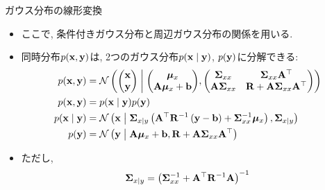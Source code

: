 \documentclass[dvipdfmx,notheorems,t]{beamer}
\begin{document}
\begin{frame}{ガウス分布の線形変換}
\begin{itemize}
  \item ここで, 条件付きガウス分布と周辺ガウス分布の関係を用いる.
  \item 同時分布$p(\vb{x}, \vb{y})$は, 2つのガウス分布$p(\vb{x} \mid \vb{y})$, $p(\vb{y})$に分解できる:
  \begin{align*}
    p(\vb{x}, \vb{y}) &= \mathcal{N} \left( \mqty(\vb{x} \\ \vb{y}) \middlerel|
      \mqty(\vb*{\mu}_x \\ \vb{A} \vb*{\mu}_x + \vb{b}),
      \mqty(\vb{\Sigma}_{xx} & \vb{\Sigma}_{xx} \vb{A}^\top \\
      \vb{A} \vb{\Sigma}_{xx} & \vb{R} + \vb{A} \vb{\Sigma}_{xx} \vb{A}^\top) \right) \\
    p(\vb{x}, \vb{y}) &= p(\vb{x} \mid \vb{y}) p(\vb{y}) \\
    p(\vb{x} \mid \vb{y}) &= \mathcal{N} \left( \vb{x} \middlerel|
      \vb{\Sigma}_{x \mid y}
      \left( \vb{A}^\top \vb{R}^{-1} \left( \vb{y} - \vb{b} \right) + \vb{\Sigma}_{xx}^{-1} \vb*{\mu}_x \right),
      \vb{\Sigma}_{x \mid y} \right) \\
    p(\vb{y}) &= \mathcal{N} \left(\vb{y} \middlerel|
      \vb{A} \vb*{\mu}_x + \vb{b}, \vb{R} + \vb{A} \vb{\Sigma}_{xx} \vb{A}^\top \right)
  \end{align*}
  \item ただし,
  \begin{align*}
    \vb{\Sigma}_{x \mid y} = \left( \vb{\Sigma}_{xx}^{-1} + \vb{A}^\top \vb{R}^{-1} \vb{A} \right)^{-1}
  \end{align*}
\end{itemize}
\end{frame}
\end{document}
